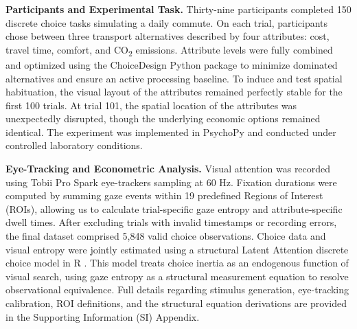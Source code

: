 \textbf{Participants and Experimental Task.} Thirty-nine participants completed 150 discrete choice tasks simulating a daily commute. On each trial, participants chose between three transport alternatives described by four attributes: cost, travel time, comfort, and CO\textsubscript{2} emissions. Attribute levels were fully combined and optimized using the ChoiceDesign Python package to minimize dominated alternatives and ensure an active processing baseline. To induce and test spatial habituation, the visual layout of the attributes remained perfectly stable for the first 100 trials. At trial 101, the spatial location of the attributes was unexpectedly disrupted, though the underlying economic options remained identical. The experiment was implemented in PsychoPy and conducted under controlled laboratory conditions.

\textbf{Eye-Tracking and Econometric Analysis.} Visual attention was recorded using Tobii Pro Spark eye-trackers sampling at 60 Hz. Fixation durations were computed by summing gaze events within 19 predefined Regions of Interest (ROIs), allowing us to calculate trial-specific gaze entropy and attribute-specific dwell times. After excluding trials with invalid timestamps or recording errors, the final dataset comprised 5,848 valid choice observations. Choice data and visual entropy were jointly estimated using a structural Latent Attention discrete choice model in R \cite{rstudio2020}. This model treats choice inertia as an endogenous function of visual search, using gaze entropy as a structural measurement equation to resolve observational equivalence. Full details regarding stimulus generation, eye-tracking calibration, ROI definitions, and the structural equation derivations are provided in the Supporting Information (SI) Appendix.
